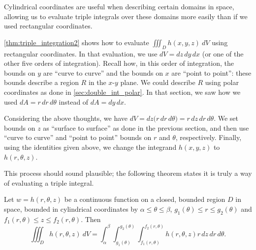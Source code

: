 Cylindrical coordinates are useful when describing certain domains in space, allowing us to evaluate triple integrals over these domains more easily than if we used rectangular coordinates.

\autoref{thm:triple_integration2} shows how to evaluate $\iiint_Dh(x,y,z)\ dV$ using rectangular coordinates. In that evaluation, we use $dV = dz\,dy\,dx$ (or one of the other five orders of integration). Recall how, in this order of integration, the bounds on $y$ are ``curve to curve'' and the bounds on $x$ are ``point to point'': these bounds describe a region $R$ in the $x$-$y$ plane. We could describe $R$ using polar coordinates as done in \autoref{sec:double_int_polar}. In that section, we saw how we used $dA = r\,dr\,d\theta$ instead of $dA = dy\,dx$. 

Considering the above thoughts, we have $dV = dz\big(r\,dr\,d\theta\big) = r\,dz\,dr\,d\theta$. We set bounds on $z$ as ``surface to surface'' as done in the previous section, and then use ``curve to curve'' and ``point to point'' bounds on $r$ and $\theta$, respectively. Finally, using the identities given above, we change the integrand $h(x,y,z)$ to $h(r,\theta,z)$.

This process should sound plausible; the following theorem states it is truly a way of evaluating a triple integral.

{%
Let $w=h(r,\theta,z)$ be a continuous function on a closed, bounded region $D$ in space, bounded in cylindrical coordinates by $\alpha \leq \theta \leq \beta$, $g_1(\theta)\leq r \leq g_2(\theta)$ and $f_1(r,\theta) \leq z \leq f_2(r,\theta)$. Then  
\[
\iiint_D h(r,\theta,z)\ dV = \int_\alpha^\beta\int_{g_1(\theta)}^{g_2(\theta)}\int_{f_1(r,\theta)}^{f_2(r,\theta)}h(r,\theta,z) r\,dz\,dr\,d\theta.
\]}


